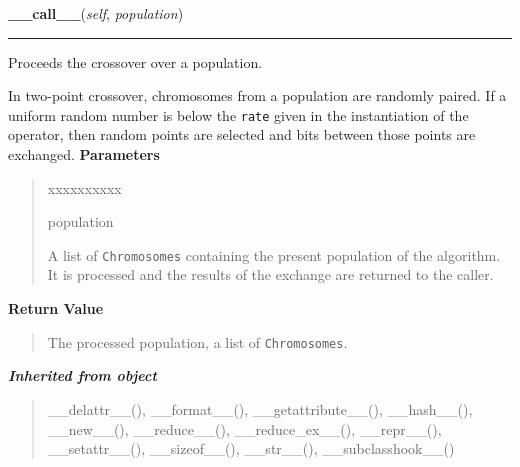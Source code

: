 \hspace{.8\funcindent}\begin{boxedminipage}{\funcwidth}

    \raggedright \textbf{\_\_call\_\_}(\textit{self}, \textit{population})

    \vspace{-1.5ex}

    \rule{\textwidth}{0.5\fboxrule}
\setlength{\parskip}{2ex}

Proceeds the crossover over a population.

In two-point crossover, chromosomes from a population are randomly
paired. If a uniform random number is below the \texttt{rate} given in the
instantiation of the operator, then random points are selected and bits
between those points are exchanged.
\setlength{\parskip}{1ex}
      \textbf{Parameters}
      \vspace{-1ex}

      \begin{quote}
        \begin{Ventry}{xxxxxxxxxx}

          \item[population]


A list of \texttt{Chromosomes} containing the present population of the
algorithm. It is processed and the results of the exchange are
returned to the caller.
        \end{Ventry}

      \end{quote}

      \textbf{Return Value}
    \vspace{-1ex}

      \begin{quote}

The processed population, a list of \texttt{Chromosomes}.
      \end{quote}

    \end{boxedminipage}


\large{\textbf{\textit{Inherited from object}}}

\begin{quote}
\_\_delattr\_\_(), \_\_format\_\_(), \_\_getattribute\_\_(), \_\_hash\_\_(), \_\_new\_\_(), \_\_reduce\_\_(), \_\_reduce\_ex\_\_(), \_\_repr\_\_(), \_\_setattr\_\_(), \_\_sizeof\_\_(), \_\_str\_\_(), \_\_subclasshook\_\_()
\end{quote}


